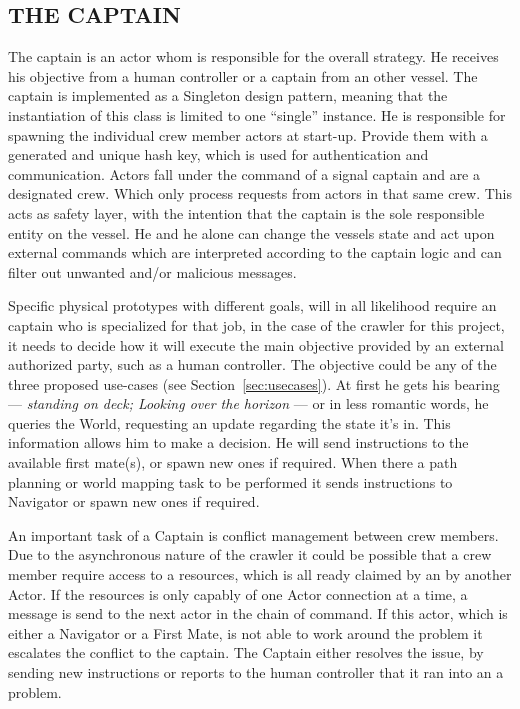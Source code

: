 \subsection{THE CAPTAIN}\label{seq:the captain}

The captain is an actor whom is responsible for the overall strategy. He receives his objective from a human controller
or a captain from an other vessel. The captain is implemented as a Singleton design pattern, meaning that the
instantiation of this class is limited to one ``single'' instance. He is responsible for spawning the individual crew
member actors at start-up. Provide them with a generated and unique hash key, which is used for authentication and
communication. Actors fall under the command of a signal captain and are a designated crew. Which only process requests
from actors in that same crew. This acts as safety layer, with the intention that the captain is the sole responsible
entity on the vessel. He and he alone can change the vessels state and act upon external commands which are interpreted
according to the captain logic and can filter out unwanted and/or malicious messages.

Specific physical prototypes with different goals, will in all likelihood require an captain who is specialized for that
job, in the case of the crawler for this project, it needs to decide how it will execute the main objective provided by
an external authorized party, such as a human controller. The objective could be any of the three proposed use-cases
(see Section~\ref{sec:usecases}). At first he gets his bearing --- \textit{standing on deck; Looking over the horizon}
--- or in less romantic words, he queries the World, requesting an update regarding the state it's in. This information
allows him to make a decision. He will send instructions to the available first mate(s), or spawn new ones if required.
When there a path planning or world mapping task to be performed it sends instructions to Navigator or spawn new ones
if required.

An important task of a Captain is conflict management between crew members. Due to the asynchronous nature of the
crawler it could be possible that a crew member require access to a resources, which is all ready claimed by an by
another Actor. If the resources is only capably of one Actor connection at a time, a message is send to the next actor
in the chain of command. If this actor, which is either a Navigator or a First Mate, is not able to work around the
problem it escalates the conflict to the captain. The Captain either resolves the issue, by sending new instructions or
reports to the human controller that it ran into an a problem.

